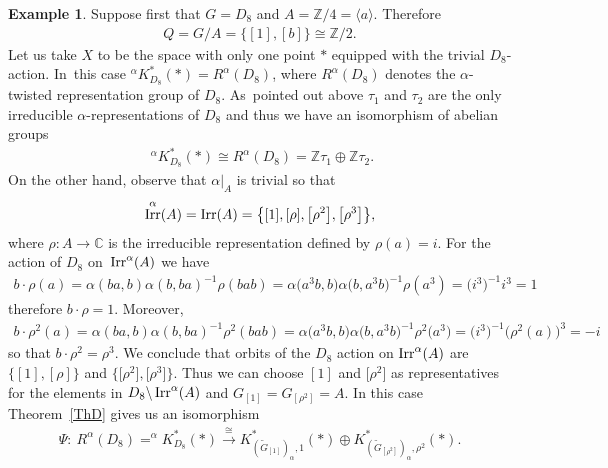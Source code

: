 \documentclass[10pt,a4paper]{amsart}
\def\Z{\mathbb{Z}}
\def\C{\mathbb{C}}
\DeclareMathOperator{\Irr}{\textup{Irr}}
\theoremstyle{definition}
\newtheorem{Ex}[Th]{Example}
\numberwithin{equation}{section}
\begin{document}
\begin{Ex}\label{Example1} Suppose first that $G=D_{8}$ and $A=\Z/4=\langle a\rangle$. Therefore
\begin{gather*}
Q=G/A=\{[1],[b]\}\cong \Z/2.
\end{gather*}
Let us take $X$ to be the space with only one point $\ast$ equipped with the trivial
$D_{8}$-action. In~this case $^{\alpha}K^{\ast}_{D_{8}}(\ast)= R^{\alpha}(D_{8})$, where
$R^{\alpha}(D_{8})$ denotes the $\alpha$-twisted representation group of $D_{8}$.
As~pointed out above $\tau_{1}$ and $\tau_{2}$ are the only irreducible
$\alpha$-representations of $D_{8}$ and thus we have an isomorphism of abelian groups
\begin{gather*}
\phantom{i}^{\alpha}K^{\ast}_{D_{8}}(\ast)\cong R^{\alpha}(D_{8})
=\Z\tau_{1}\oplus\Z\tau_{2}.
\end{gather*}
On the other hand, observe that
$\alpha|_{A}$ is trivial so that
\begin{gather*}
\Irr^{\alpha}(A)=\Irr(A)=\big\{[1],[\rho],\big[\rho^{2}\big], \big[\rho^{3}\big]\big\},
\end{gather*}
where $\rho\colon A\rightarrow \C$ is the irreducible representation defined by $\rho(a)=i$.
For the action of $D_{8}$ on~$\Irr^{\alpha}(A)$ we have
\begin{gather*}
b\cdot\rho(a)=\alpha(ba,b)\alpha(b,ba)^{-1}\rho(bab)
=\alpha\big(a^{3}b,b\big)\alpha\big(b,a^{3}b\big)^{-1}\rho(a^{3})
=\big(i^{3}\big)^{-1}i^{3}=1
\end{gather*}
therefore $b\cdot \rho=1$. Moreover,
\begin{gather*}
b\cdot\rho^{2}(a)=\alpha(ba,b)\alpha(b,ba)^{-1}\rho^{2}(bab)
=\alpha\big(a^{3}b,b\big)\alpha\big(b,a^{3}b\big)^{-1}\rho^{2}\big(a^{3}\big)
=\big(i^{3}\big)^{-1}\big(\rho^{2}(a)\big)^{3}=-i
\end{gather*}
so that $b\cdot\rho^{2}=\rho^{3}$. We conclude that orbits of the $D_{8}$ action on
$\Irr^{\alpha}(A)$ are $\{[1],[\rho]\}$ and $\big\{\big[\rho^{2}\big],\big[\rho^{3}\big]\big\}$. Thus we can choose
$[1]$ and $\big[\rho^{2}\big]$ as representatives for the elements in $D_{8}\backslash \Irr^{\alpha}(A)$
and $G_{[1]}=G_{[\rho^{2}]}=A$.
In this case Theorem~\ref{ThD} gives us an isomorphism
\begin{gather*}
\Psi\colon\ R^{\alpha}(D_{8})=^{\alpha}K^{\ast}_{D_{8}}(\ast)\stackrel{\cong}{\rightarrow}
K^{\ast}_{(\widetilde{G}_{[1]})_{\alpha},1}(\ast)\oplus
K^{\ast}_{(\widetilde{G}_{[\rho^{2}]})_{\alpha},\rho^{2}}(\ast).
\end{gather*}

\end{Ex}
\end{document}
